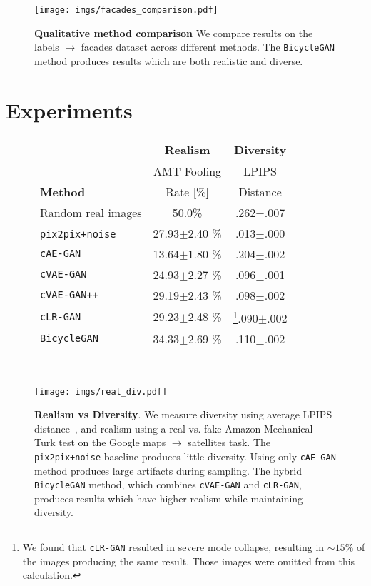 \documentclass{article}
\newcommand{\ppn}{\texttt{pix2pix+noise}\xspace}
\newcommand{\cinfogan}{\texttt{cLR-GAN}\xspace}
\newcommand{\cae}{\texttt{cAE-GAN}\xspace}
\newcommand{\cvaegan}{\texttt{cVAE-GAN}\xspace}
\newcommand{\cvaeganp}{\texttt{cVAE-GAN++}\xspace}
\newcommand{\bicycle}{\texttt{BicycleGAN}\xspace} \newcommand{\G}{G\xspace}
\begin{document}
\begin{figure}
\centering
\hspace{\linewidth}
\texttt{[image: imgs/facades\_comparison.pdf]}
\caption{\small \textbf{Qualitative method comparison} We compare results on the labels $\rightarrow$ facades dataset across different methods. The \bicycle method produces results which are both realistic and diverse.}
\label{fig:resultsFacades}
\end{figure}

\section{Experiments}
\label{sec:exp}
\begin{figure}
  \centering
  \begin{minipage}[b]{0.54\linewidth}  
  \scalebox{0.92} {
  \begin{tabular}{l c c}
	& \textbf{Realism} & \textbf{Diversity} \\ \hline
	& AMT Fooling & LPIPS \\
	\textbf{Method} & Rate [\%] & Distance \\ \hline
	Random real images & 50.0\% & .262$\pm$.007 \\ \hline
	\ppn~\citep{isola2016image} & 27.93$\pm$2.40 \% & .013$\pm$.000 \\
	\cae & 13.64$\pm$1.80 \% & .204$\pm$.002 \\
	\cvaegan & 24.93$\pm$2.27 \% & .096$\pm$.001 \\
	\cvaeganp & 29.19$\pm$2.43 \% & .098$\pm$.002 \\
	\cinfogan & 29.23$\pm$2.48 \% & \footnote{We found that \cinfogan resulted in severe mode collapse, resulting in $\sim15\%$ of the images producing the same result. Those images were omitted from this calculation.}.090$\pm$.002 \\
	\bicycle & 34.33$\pm$2.69 \% & .110$\pm$.002 \\ \hline
	\end{tabular} } \\
	
  \end{minipage}
  \begin{minipage}[b]{0.45\linewidth}
  \texttt{[image: imgs/real\_div.pdf]} 
  \end{minipage}
  \vspace{-4mm}
  \caption{\small \textbf{Realism vs Diversity}. We measure diversity using average LPIPS distance~\cite{zhang2018unreasonable}, and realism using a real vs. fake Amazon Mechanical Turk test on the Google maps $\rightarrow$ satellites task. The \ppn baseline produces little diversity. Using only \cae method produces large artifacts during sampling. The hybrid \bicycle method, which combines \cvaegan and \cinfogan, produces results which have higher realism while maintaining diversity.
  }
  \vspace{-5mm}
  \label{fig:real_vs_div}
\end{figure}
\end{document}
